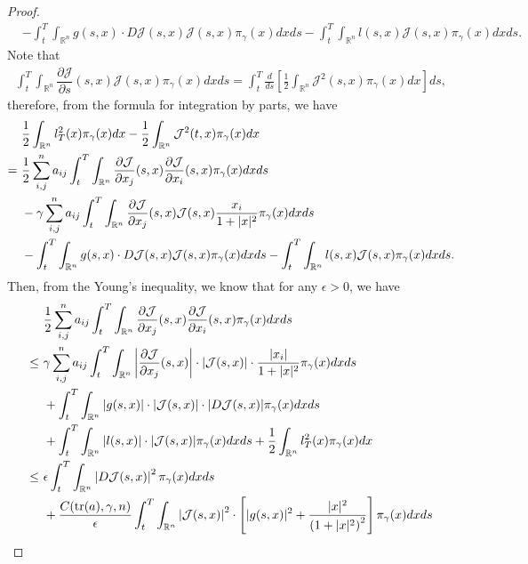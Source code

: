 \documentclass[11pt]{article}
\numberwithin{equation}{section}
\newcommand{\brn}{{\mathbb{R}^n}}
\newcommand{\1}{\mbox{1\hspace{-1mm}I}}
\begin{document}
\begin{proof}
\begin{align*}
    &-\int_{t}^{T}\int_{\brn}g(s,x)\cdot D\mathcal{J}(s,x)\mathcal{J}(s,x)\pi_{\gamma}(x)dxds - \int_{t}^{T}\int_{\brn}l(s,x)\mathcal{J}(s,x)\pi_{\gamma}(x)dxds.
\end{align*}
Note that 
\begin{align*}
    \int_{t}^{T}\int_{\brn}\dfrac{\partial \mathcal{J}}{\partial s}(s,x)\mathcal{J}(s,x)\pi_{\gamma}(x)dxds=\int_{t}^{T}\frac{d}{ds}\left[\frac{1}{2}\int_{\brn}\mathcal{J}^2(s,x)\pi_{\gamma}(x)dx\right]ds,
\end{align*}
therefore, from the formula for integration by parts, we have
\begin{align}
    & \dfrac{1}{2}\int_{\brn}l_{T}^{2}(x)\pi_{\gamma}(x)dx - \dfrac{1}{2}\int_{\brn}\mathcal{J}^{2}(t,x)\pi_{\gamma}(x)dx \notag \\
    =\ &\dfrac{1}{2}\sum_{i,j}^n a_{ij}\int_{t}^{T}\int_{\brn}\dfrac{\partial\mathcal{J}}{\partial x_{j}}(s,x)\dfrac{\partial\mathcal{J}}{\partial x_{i}}(s,x)\pi_{\gamma}(x)dxds \notag \\
    &-\gamma\sum_{i,j}^n a_{ij}\int_{t}^{T}\int_{\brn}\dfrac{\partial\mathcal{J}}{\partial x_{j}}(s,x)\mathcal{J}(s,x)\dfrac{x_{i}}{1+|x|^{2}}\pi_{\gamma}(x)dxds \notag \\
    &-\int_{t}^{T}\int_{\brn}g(s,x)\cdot D\mathcal{J}(s,x)\mathcal{J}(s,x)\pi_{\gamma}(x)dxds-\int_{t}^{T}\int_{\brn}l(s,x)\mathcal{J}(s,x)\pi_{\gamma}(x)dxds. \notag
\end{align}
Then, from the Young's inequality, we know that for any $\epsilon>0$, we have
\begin{align}
    &\dfrac{1}{2}\sum_{i,j}^n a_{ij}\int_{t}^{T}\int_{\brn}\dfrac{\partial\mathcal{J}}{\partial x_{j}}(s,x)\dfrac{\partial\mathcal{J}}{\partial x_{i}}(s,x)\pi_{\gamma}(x)dxds \notag \\
    \le\ & \gamma\sum_{i,j}^n a_{ij}\int_{t}^{T}\int_{\brn}\left|\dfrac{\partial\mathcal{J}}{\partial x_{j}}(s,x)\right| \cdot\left|\mathcal{J}(s,x)\right|\cdot\dfrac{|x_{i}|}{1+|x|^{2}}  \pi_{\gamma}(x) dxds \notag \\
    &+\int_{t}^{T}\int_{\brn}|g(s,x)|\cdot|\mathcal{J}(s,x)|\cdot |D\mathcal{J}(s,x)| \pi_{\gamma}(x)dxds \notag \\
    &+\int_{t}^{T}\int_{\brn} |l(s,x)|\cdot |\mathcal{J}(s,x)|\pi_{\gamma}(x)dxds +\dfrac{1}{2}\int_{\brn}l_{T}^{2}(x)\pi_{\gamma}(x)dx \notag \\
    \le\ & \epsilon \int_{t}^{T}\int_{\brn}\left|D\mathcal{J}(s,x)\right|^2 \pi_{\gamma}(x) dxds \notag \\
    &+ \frac{C(\text{tr}(a),\gamma,n)}{\epsilon}\int_{t}^{T}\int_{\brn} \left|\mathcal{J}(s,x)\right|^2\cdot\left[ |g(s,x)|^2 + \dfrac{|x|^2}{\left(1+|x|^{2}\right)^2}  \right]\pi_{\gamma}(x) dxds \notag \\

\end{align}
\end{proof}
\end{document}

